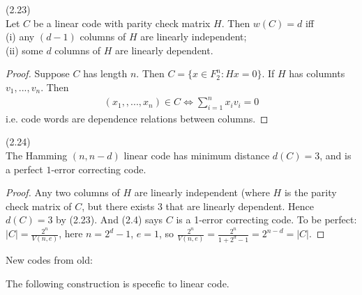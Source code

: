 \documentclass[a4paper]{article}
\begin{document}
\begin{lemma} (2.23)\\
Let $C$ be a linear code with parity check matrix $H$. Then $w(C) = d$ iff\\
(i) any $(d-1)$ columns of $H$ are linearly independent;\\
(ii) some $d$ columns of $H$ are linearly dependent.
\begin{proof}
Suppose $C$ has length $n$. Then $C = \{x \in F_2^n: Hx = 0\}$. If $H$ has columnts $v_1,...,v_n$. Then
\begin{equation*}
\begin{aligned}
(x_1,,...,x_n) \in C \iff \sum_{i=1}^n x_i v_i = 0
\end{aligned}
\end{equation*}
i.e. code words are dependence relations between columns.
\end{proof}
\end{lemma}

\begin{lemma} (2.24)\\
The Hamming $(n,n-d)$ linear code has minimum distance $d(C) = 3$, and is a perfect $1$-error correcting code.
\begin{proof}
Any two columns of $H$ are linearly independent (where $H$ is the parity check matrix of $C$, but there exists $3$ that are linearly dependent. Hence $d(C) = 3$ by (2.23). And (2.4) says $C$ is a 1-error correcting code. To be perfect: $|C| = \frac{2^n}{V(n,e)}$, here $n = 2^d - 1$, $e=1$, so $\frac{2^n}{V(n,e)} = \frac{2^n}{1+2^d-1} = 2^{n-d} = |C|$.
\end{proof}
\end{lemma}

New codes from old:

The following construction is specefic to linear code.
\end{document}
